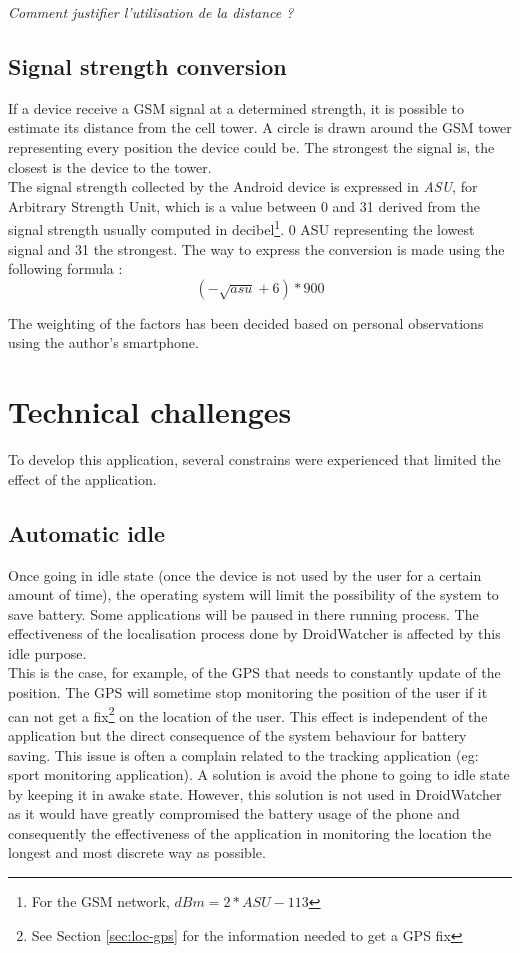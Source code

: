 \emph{Comment justifier l'utilisation de la distance ?}

\subsection{Signal strength conversion}

If a device receive a GSM signal at a determined strength, it is possible to estimate its distance from the cell tower.
A circle is drawn around the GSM tower representing every position the device could be.
The strongest the signal is, the closest is the device to the tower.\\

The signal strength collected by the Android device is expressed in \emph{ASU}, for Arbitrary Strength Unit, which is a value between 0 and 31 derived from the signal strength usually computed in decibel\footnote{For the GSM network, $dBm = 2 * ASU - 113$}.
0 ASU representing the lowest signal and 31 the strongest.
The way to express the conversion is made using the following formula :\\

\[
 (-\sqrt{asu}+6)*900
\]

The weighting of the factors has been decided based on personal observations using the author's smartphone.

\section{Technical challenges}

To develop this application, several constrains were experienced that limited the effect of the application.

\subsection{Automatic idle}

Once going in idle state (once the device is not used by the user for a certain amount of time), the operating system will limit the possibility of the system to save battery.
Some applications will be paused in there running process.
The effectiveness of the localisation process done by DroidWatcher is affected by this idle purpose.\\

This is the case, for example, of the GPS that needs to constantly update of the position.
The GPS will sometime stop monitoring the position of the user if it can not get a fix\footnote{See Section \ref{sec:loc-gps} for the information needed to get a GPS fix} on the location of the user.
This effect is independent of the application but the direct consequence of the system behaviour for battery saving. 
This issue is often a complain related to the tracking application (eg: sport monitoring application).
A solution is avoid the phone to going to idle state by keeping it in awake state.
However, this solution is not used in DroidWatcher as it would have greatly compromised the battery usage of the phone and consequently the effectiveness of the application in monitoring the location the longest and most discrete way as possible.

